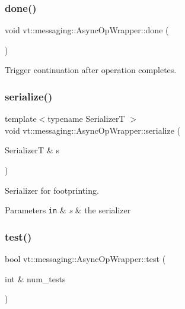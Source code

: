 \subsubsection{\texorpdfstring{done()}{done()}}
{\footnotesize\ttfamily void vt\+::messaging\+::\+Async\+Op\+Wrapper\+::done (\begin{DoxyParamCaption}{ }\end{DoxyParamCaption})}



Trigger continuation after operation completes. 

\mbox{\label{structvt_1_1messaging_1_1_async_op_wrapper_a219a6d0d317bd75c0d559dbb91838166}} 
\subsubsection{\texorpdfstring{serialize()}{serialize()}}
{\footnotesize\ttfamily template$<$typename SerializerT $>$ \\
void vt\+::messaging\+::\+Async\+Op\+Wrapper\+::serialize (\begin{DoxyParamCaption}\item[{SerializerT \&}]{s }\end{DoxyParamCaption})\hspace{0.3cm}{\ttfamily [inline]}}



Serializer for footprinting. 


\begin{DoxyParams}[1]{Parameters}
\mbox{\tt in}  & {\em s} & the serializer \\
\hline
\end{DoxyParams}
\mbox{\label{structvt_1_1messaging_1_1_async_op_wrapper_a09ca2119c78c9b3663ad6a3708d3a3c7}} 
\subsubsection{\texorpdfstring{test()}{test()}}
{\footnotesize\ttfamily bool vt\+::messaging\+::\+Async\+Op\+Wrapper\+::test (\begin{DoxyParamCaption}\item[{int \&}]{num\+\_\+tests }\end{DoxyParamCaption})}



